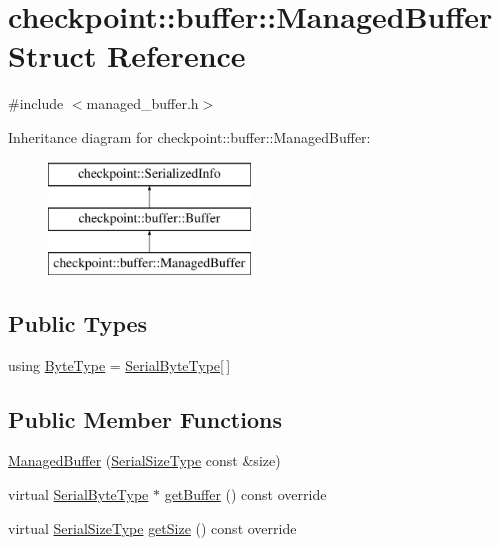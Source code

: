 \hypertarget{structcheckpoint_1_1buffer_1_1_managed_buffer}{}\section{checkpoint\+:\+:buffer\+:\+:Managed\+Buffer Struct Reference}
\label{structcheckpoint_1_1buffer_1_1_managed_buffer}


{\ttfamily \#include $<$managed\+\_\+buffer.\+h$>$}

Inheritance diagram for checkpoint\+:\+:buffer\+:\+:Managed\+Buffer\+:\begin{figure}[H]
\begin{center}
\leavevmode
\includegraphics[height=3.000000cm]{structcheckpoint_1_1buffer_1_1_managed_buffer}
\end{center}
\end{figure}
\subsection*{Public Types}
\begin{DoxyCompactItemize}
\item 
using \hyperlink{structcheckpoint_1_1buffer_1_1_managed_buffer_a89ff3aa4c92cd2c65973751ff4328dd5}{Byte\+Type} = \hyperlink{namespacecheckpoint_ae57f01cdc0b81776c23b6c7c934c58f5}{Serial\+Byte\+Type}\mbox{[}$\,$\mbox{]}
\end{DoxyCompactItemize}
\subsection*{Public Member Functions}
\begin{DoxyCompactItemize}
\item 
\hyperlink{structcheckpoint_1_1buffer_1_1_managed_buffer_aa73edc51a8e538d5ca67fc9d1df42ba5}{Managed\+Buffer} (\hyperlink{namespacecheckpoint_a083f6674da3f94c2901b18c6d238217c}{Serial\+Size\+Type} const \&size)
\item 
virtual \hyperlink{namespacecheckpoint_ae57f01cdc0b81776c23b6c7c934c58f5}{Serial\+Byte\+Type} $\ast$ \hyperlink{structcheckpoint_1_1buffer_1_1_managed_buffer_a9a44d0c4e088ac080f13c84072a86e91}{get\+Buffer} () const override
\item 
virtual \hyperlink{namespacecheckpoint_a083f6674da3f94c2901b18c6d238217c}{Serial\+Size\+Type} \hyperlink{structcheckpoint_1_1buffer_1_1_managed_buffer_a26f85bcd885624b7c0ad6fd8572ad466}{get\+Size} () const override
\end{DoxyCompactItemize}
